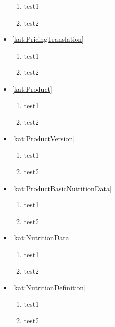\begin{itemize}[label={\textbf{Ograniczenia dla}}, wide, labelwidth=!, labelindent=0pt]
\begin{enumerate}[label={\textbf{OGR/\protect\threedigits{\arabic{enumi}}}}, wide, labelwidth=!, resume]
        \item test1
        \item test2
    \end{enumerate}
    \item\ref{kat:PricingTranslation}
    \begin{enumerate}[label={\textbf{OGR/\protect\threedigits{\arabic{enumi}}}}, wide, labelwidth=!, resume]
        \item test1
        \item test2
    \end{enumerate}
    \item\ref{kat:Product}
    \begin{enumerate}[label={\textbf{OGR/\protect\threedigits{\arabic{enumi}}}}, wide, labelwidth=!, resume]
        \item test1
        \item test2
    \end{enumerate}
    \item\ref{kat:ProductVersion}
    \begin{enumerate}[label={\textbf{OGR/\protect\threedigits{\arabic{enumi}}}}, wide, labelwidth=!, resume]
        \item test1
        \item test2
    \end{enumerate}
    \item\ref{kat:ProductBasicNutritionData}
    \begin{enumerate}[label={\textbf{OGR/\protect\threedigits{\arabic{enumi}}}}, wide, labelwidth=!, resume]
        \item test1
        \item test2
    \end{enumerate}
    \item\ref{kat:NutritionData}
    \begin{enumerate}[label={\textbf{OGR/\protect\threedigits{\arabic{enumi}}}}, wide, labelwidth=!, resume]
        \item test1
        \item test2
    \end{enumerate}
    \item\ref{kat:NutritionDefinition}
    \begin{enumerate}[label={\textbf{OGR/\protect\threedigits{\arabic{enumi}}}}, wide, labelwidth=!, resume]
        \item test1
        \item test2
    \end{enumerate}

\end{itemize}

